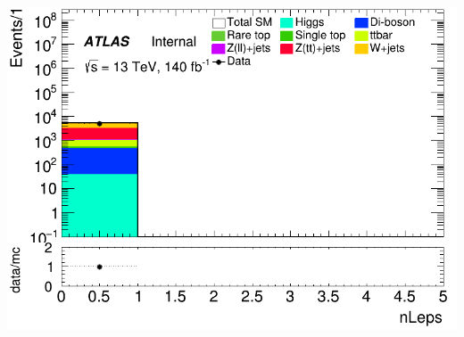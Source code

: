 \documentclass[usenames,dvipsnames]{beamer}
\begin{document}
\begin{frame}
\begin{minipage}{0.32\textwidth}
        \includegraphics[width=\textwidth]{graphics/H_met/H_met_nLeps.png}
    \end{minipage}
    
    \vspace{0.5cm} %


\end{frame}
\end{document}
